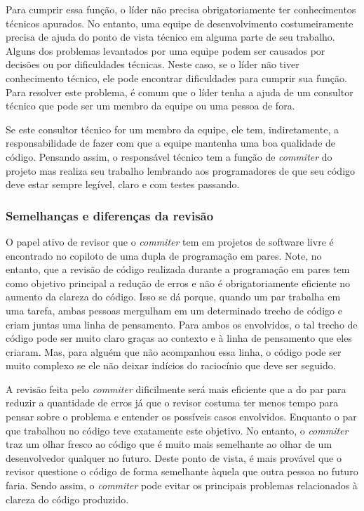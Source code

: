 Para cumprir essa função, o líder não precisa obrigatoriamente ter
conhecimentos técnicos apurados. No entanto, uma equipe de
desenvolvimento costumeiramente precisa de ajuda do ponto de vista
técnico em alguma parte de seu trabalho. Alguns dos problemas
levantados por uma equipe podem ser causados por decisões ou por
dificuldades técnicas. Neste caso, se o líder não tiver conhecimento
técnico, ele pode encontrar dificuldades para cumprir sua função. Para
resolver este problema, é comum que o líder tenha a ajuda de um
consultor técnico que pode ser um membro da equipe ou uma pessoa de
fora.

Se este consultor técnico for um membro da equipe, ele tem,
indiretamente, a responsabilidade de fazer com que a equipe mantenha
uma boa qualidade de código. Pensando assim, o responsável técnico tem
a função de \emph{commiter} do projeto mas realiza seu trabalho
lembrando aos programadores de que seu código deve estar sempre
legível, claro e com testes passando.

\subsubsection{Semelhanças e diferenças da revisão}

O papel ativo de revisor que o \emph{commiter} tem em projetos de
software livre é encontrado no copiloto de uma dupla de programação em
pares. Note, no entanto, que a revisão de código realizada durante a
programação em pares tem como objetivo principal a redução de erros e
não é obrigatoriamente eficiente no aumento da clareza do código. Isso
se dá porque, quando um par trabalha em uma tarefa, ambas pessoas
mergulham em um determinado trecho de código e criam juntas uma linha
de pensamento. Para ambos os envolvidos, o tal trecho de código pode
ser muito claro graças ao contexto e à linha de pensamento que eles
criaram. Mas, para alguém que não acompanhou essa linha, o código pode
ser muito complexo se ele não deixar indícios do raciocínio que deve
ser seguido.

A revisão feita pelo \emph{commiter} dificilmente será mais eficiente
que a do par para reduzir a quantidade de erros já que o revisor
costuma ter menos tempo para pensar sobre o problema e entender os
possíveis casos envolvidos. Enquanto o par que trabalhou no código
teve exatamente este objetivo. No entanto, o \emph{commiter} traz um
olhar fresco ao código que é muito mais semelhante ao olhar de um
desenvolvedor qualquer no futuro. Deste ponto de vista, é mais
provável que o revisor questione o código de forma semelhante àquela
que outra pessoa no futuro faria. Sendo assim, o \emph{commiter} pode
evitar os principais problemas relacionados à clareza do código
produzido.

